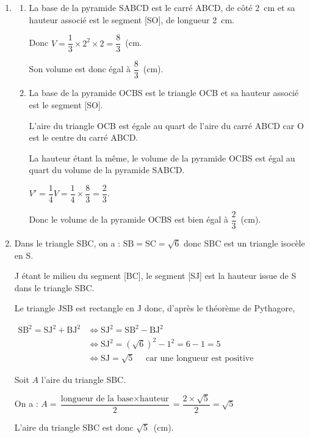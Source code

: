 \documentclass[10pt]{article}
\begin{document}
\begin{enumerate}
\item
	\begin{enumerate}
			\item La base de la pyramide SABCD est le carré ABCD, de côté 2~cm et sa hauteur associé est le segment [SO], de longueur 2~cm.

Donc $V= \dfrac{1}{3} \times 2^2\times 2 = \dfrac{8}{3}$~(cm.

Son volume est donc égal à \quad $\dfrac{8}{3}$~(cm).

			\item La base de la pyramide OCBS est le triangle OCB et sa hauteur associé est le segment [SO].

L'aire du triangle OCB est égale au quart de l'aire du carré ABCD car O est le centre du carré ABCD.

La hauteur étant la même, le volume de la pyramide OCBS est égal au quart du volume de la pyramide SABCD.

$V'= \dfrac{1}{4} V = \dfrac{1}{4} \times \dfrac{8}{3} = \dfrac{2}{3}$.

Donc le volume de la pyramide OCBS est bien égal à $\dfrac{2}{3}$~(cm).
	\end{enumerate}

		\item Dans le triangle SBC, on a : \quad $\mathrm{SB} = \mathrm{SC} = \sqrt{6}$ \quad donc SBC est un triangle isocèle en S.

J étant le milieu du segment [BC], le segment [SJ] est la hauteur issue de S dans le triangle SBC.

Le triangle JSB est rectangle en J donc, d'après le théorème de Pythagore,

$\begin{aligned} \mathrm{SB}^2 = \mathrm{SJ}^2+ \mathrm{BJ}^2 & \iff
\mathrm{SJ}^2 = \mathrm{SB}^2- \mathrm{BJ}^2 \\
	& \iff \mathrm{SJ}^2 = \left(\sqrt{6}\right)^2- 1^2= 6-1=5\\
	& \iff	\mathrm{SJ}=\sqrt{5} \quad \text{ car une longueur est positive}
\end{aligned}$

Soit $A$ l'aire du triangle SBC.

On a : \quad $A= \dfrac{\text{longueur de la base} \times \text{hauteur}}{2} = \dfrac{2 \times \sqrt{5}}{2}= \sqrt{5}$

L'aire du triangle SBC est donc $\sqrt{5}$~(cm).


\end{enumerate}
\end{document}
